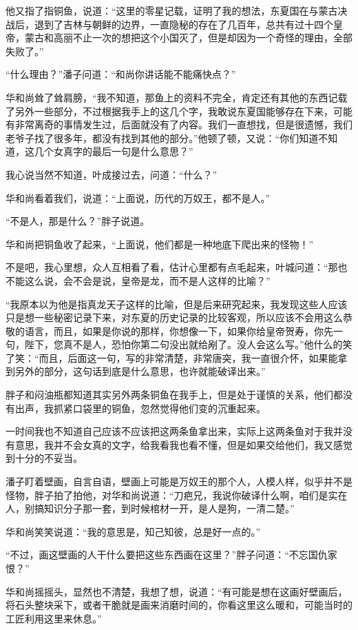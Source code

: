 他又指了指铜鱼，说道：“这里的零星记载，证明了我的想法，东夏国在与蒙古决战后，退到了吉林与朝鲜的边界，一直隐秘的存在了几百年，总共有过十四个皇帝，蒙古和高丽不止一次的想把这个小国灭了，但是却因为一个奇怪的理由，全部失败了。”

“什么理由？”潘子问道：“和尚你讲话能不能痛快点？”

华和尚耸了耸肩膀，“我不知道，那鱼上的资料不完全，肯定还有其他的东西记载了另外一些部分，不过根据我手上的这几个字，我敢说东夏国能够存在下来，可能有非常离奇的事情发生过，后面就没有了内容。我们一直想找，但是很遗憾，我们老爷子找了很多年，都没有找到其他的部分。”他顿了顿，又说：“你们知道不知道，这几个女真字的最后一句是什么意思？”

我心说当然不知道，叶成接过去，问道：“什么？”

华和尚看着我们，说道：“上面说，历代的万奴王，都不是人。”

“不是人，那是什么？”胖子说道。

华和尚把铜鱼收了起来，“上面说，他们都是一种地底下爬出来的怪物！”

不是吧，我心里想，众人互相看了看，估计心里都有点毛起来，叶城问道：“那也不能这么说，会不会是说，皇帝是龙，而不是人这样的比喻？”

“我原本以为他是指真龙天子这样的比喻，但是后来研究起来，我发现这些人应该只是想一些秘密记录下来，对东夏的历史记录的比较客观，所以应该不会用这么恭敬的语言，而且，如果是你说的那样，你想像一下，如果你给皇帝贺寿，你先一句，陛下，您真不是人，恐怕你第二句没出就给剐了。没人会这么写。”他什么的笑了笑：“而且，后面这一句，写的非常清楚，非常唐突，我一直很介怀，如果能拿到另外的部分，这句话到底是什么意思，也许就能破译出来。”

胖子和闷油瓶都知道其实另外两条铜鱼在我手上，但是处于谨慎的关系，他们都没有出声，我抓紧口袋里的铜鱼，忽然觉得他们变的沉重起来。

一时间我也不知道自己应该不应该把这两条鱼拿出来，实际上这两条鱼对于我并没有意思，我并不会女真的文字，给我看我也看不懂，但是如果交给他们，我又感觉到十分的不妥当。

潘子盯着壁画，自言自语，壁画上可能是万奴王的那个人，人模人样，似乎并不是怪物，胖子拍了拍他，对华和尚说道：“刀疤兄，我说你破译什么啊，咱们是实在人，别搞知识分子那一套，到时候棺材一开，是人是狗，一清二楚。”

华和尚笑笑说道：“我的意思是，知己知彼，总是好一点的。”

“不过，画这壁画的人干什么要把这些东西画在这里？”胖子问道：“不忘国仇家恨？”

华和尚摇摇头，显然也不清楚，我想了想，说道：“有可能是想在这画好壁画后，将石头整块采下，或者干脆就是画来消磨时间的，你看这里这么暖和，可能当时的工匠利用这里来休息。”

